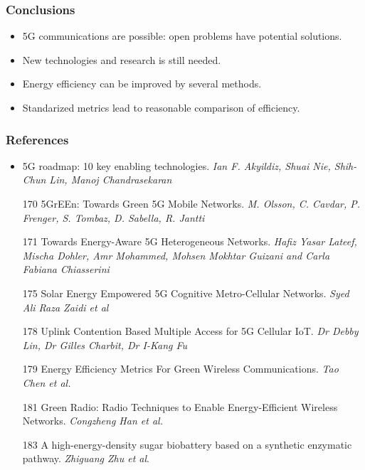 \documentclass[a4paper,11pt,handout]{beamer}
\begin{document}
\begin{frame}
\frametitle{Conclusions}

\begin{itemize}
	\item 5G communications are possible: open problems have potential solutions.
	\item New technologies and research is still needed.
	\item Energy efficiency can be improved by several methods.
	\item Standarized metrics lead to reasonable comparison of efficiency.
\end{itemize}
\end{frame}
\begin{frame}
\frametitle{References}
\footnotesize
\begin{itemize}
\item 5G roadmap: 10 key enabling technologies. \textit{Ian F. Akyildiz, Shuai 
Nie, Shih-Chun Lin, Manoj Chandrasekaran}
\item[170] 5GrEEn: Towards Green 5G Mobile Networks. \textit{M. Olsson, C.  
Cavdar, P.  Frenger, S. Tombaz, D. Sabella, R. Jantti}
\item[171] Towards Energy-Aware 5G Heterogeneous Networks. \textit{Hafiz Yasar 
Lateef, Mischa Dohler, Amr Mohammed, Mohsen Mokhtar Guizani and Carla Fabiana 
Chiasserini}
\item[175] Solar Energy Empowered 5G Cognitive Metro-Cellular Networks.  
\textit{Syed Ali Raza Zaidi et al}
\item[178] Uplink Contention Based Multiple Access  for 5G Cellular IoT.  
\textit{Dr Debby Lin, Dr Gilles Charbit, Dr I-Kang Fu}
\item[179] Energy Efficiency Metrics For Green Wireless Communications.  
\textit{Tao Chen et al.}
\item[181] Green Radio: Radio Techniques to Enable Energy-Efficient Wireless 
Networks. \textit{Congzheng Han et al.}
\item[183] A high-energy-density sugar biobattery based on a synthetic enzymatic 
pathway. \textit{Zhiguang Zhu et al}.
\end{itemize}
\end{frame}
\note{
}
\end{document}
